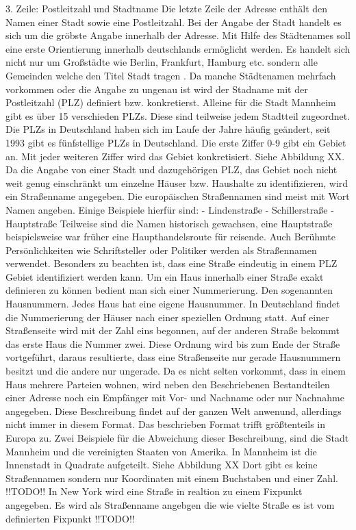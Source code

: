 3. Zeile: Postleitzahl und Stadtname
Die letzte Zeile der Adresse enthält den Namen einer Stadt sowie eine Postleitzahl. Bei der Angabe der Stadt handelt es sich um die gröbste Angabe innerhalb der Adresse. Mit Hilfe des Städtenames soll eine erste Orientierung innerhalb deutschlands ermöglicht werden. Es handelt sich nicht nur um Großstädte wie Berlin, Frankfurt, Hamburg etc. sondern alle Gemeinden welche den Titel Stadt tragen .
Da manche Städtenamen mehrfach vorkommen oder die Angabe zu ungenau ist wird der Stadname mit der Postleitzahl (PLZ) definiert bzw. konkretierst. Alleine für die Stadt Mannheim gibt es über 15 verschieden PLZs. Diese sind teilweise jedem Stadtteil zugeordnet.
 Die PLZs in Deutschland haben sich im Laufe der Jahre häufig geändert, seit 1993 gibt es fünfstellige PLZs in Deutschland. Die erste Ziffer 0-9 gibt ein Gebiet an. Mit jeder weiteren Ziffer wird das Gebiet konkretisiert. Siehe Abbildung XX. Da die Angabe von einer Stadt und dazugehörigen PLZ, das Gebiet noch nicht weit genug einschränkt um einzelne Häuser bzw. Haushalte zu identifizieren, wird ein Straßenname angegeben.
Die europäischen Straßennamen sind meist mit Wort Namen angeben.
Einige Beispiele hierfür sind:
-	Lindenstraße
-	Schillerstraße
-	Hauptstraße
Teilweise sind die Namen historisch gewachsen, eine Hauptstraße beispielsweise war früher eine Haupthandelsroute für reisende. Auch Berühmte Persönlichkeiten wie Schriftsteller oder Politiker werden als Straßennamen verwendet. Besonders zu beachten ist, dass eine Straße eindeutig in einem PLZ Gebiet identifiziert werden kann.
Um ein Haus innerhalb einer Straße exakt definieren zu können bedient man sich einer Nummerierung. Den sogenannten Hausnummern. Jedes Haus hat eine eigene Hausnummer. 
In Deutschland findet die Nummerierung der Häuser nach einer speziellen Ordnung statt. Auf einer Straßenseite wird mit der Zahl eins begonnen, auf der anderen Straße bekommt das erste Haus die Nummer zwei. Diese Ordnung wird bis zum Ende der Straße vortgeführt, daraus resultierte, dass eine Straßenseite nur gerade Hausnummern besitzt und die andere nur ungerade.
Da es nicht selten vorkommt, dass in einem Haus mehrere Parteien wohnen, wird neben den Beschriebenen Bestandteilen einer Adresse noch ein Empfänger mit Vor- und Nachname oder nur Nachnahme angegeben.
Diese Beschreibung findet auf der ganzen Welt anwenund, allerdings nicht immer in diesem Format. Das beschrieben Format trifft größtenteils in Europa zu. Zwei Beispiele für die Abweichung dieser Beschreibung, sind die Stadt Mannheim und die vereinigten Staaten von Amerika.
In Mannheim ist die Innenstadt in Quadrate aufgeteilt. Siehe Abbildung XX 
Dort gibt es keine Straßennamen sondern nur Koordinaten mit einem Buchstaben und einer Zahl.
!!TODO!! In New York wird eine Straße in realtion zu einem Fixpunkt angegeben. Es wird als Straßenname angebgen die wie vielte Straße es ist vom definierten Fixpunkt !!TODO!! 




